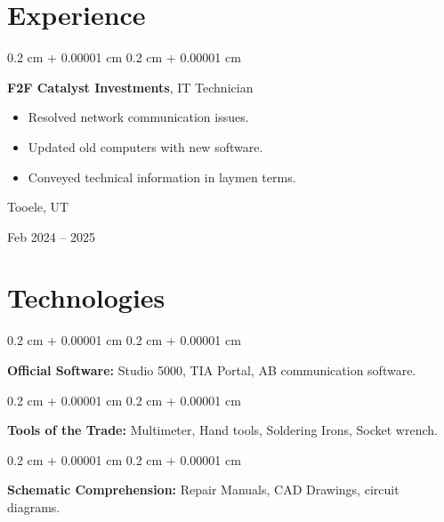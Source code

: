 \documentclass[10pt, letterpaper]{article}
\newenvironment{highlights}{
    \begin{itemize}[
        topsep=0.10 cm,
        parsep=0.10 cm,
        partopsep=0pt,
        itemsep=0pt,
        leftmargin=0.4 cm + 10pt
    ]
}{
    \end{itemize}
} %
\newenvironment{onecolentry}{
    \begin{adjustwidth}{
        0.2 cm + 0.00001 cm
    }{
        0.2 cm + 0.00001 cm
    }
}{
    \end{adjustwidth}
} %
\newenvironment{twocolentry}[2][]{
    \onecolentry
    \def\secondColumn{#2}
    \setcolumnwidth{\fill, 4.5 cm}
    \begin{paracol}{2}
}{
    \switchcolumn \raggedleft \secondColumn
    \end{paracol}
    \endonecolentry
} %
\begin{document}
    
    \section{Experience}



        
        \begin{twocolentry}{
            Tooele, UT

        Feb 2024 – 2025
        }
            \textbf{F2F Catalyst Investments}, IT Technician
            \begin{highlights}
                \item Resolved network communication issues.
                \item Updated old computers with new software.
                \item Conveyed technical information in laymen terms.
            \end{highlights}
        \end{twocolentry}



    
    \section{Technologies}



        
        \begin{onecolentry}
            \textbf{Official Software:} Studio 5000, TIA Portal, AB communication software.
        \end{onecolentry}

        \vspace{0.2 cm}

        \begin{onecolentry}
            \textbf{Tools of the Trade:} Multimeter, Hand tools, Soldering Irons, Socket wrench.
        \end{onecolentry}

        \vspace{0.2 cm}

        \begin{onecolentry}
            \textbf{Schematic Comprehension:} Repair Manuals, CAD Drawings, circuit diagrams.
        \end{onecolentry}


    
\end{document}
